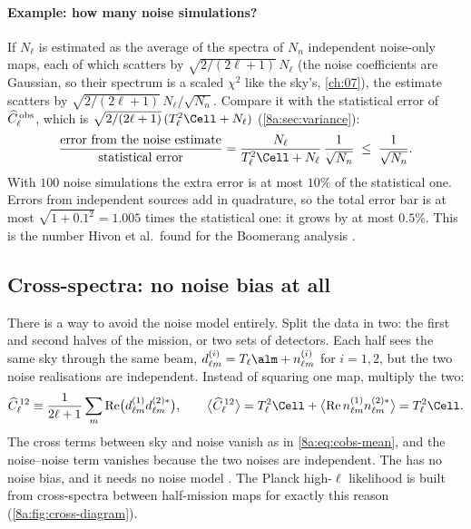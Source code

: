 \paragraph{Example: how many noise simulations?}
If $N_\ell$ is estimated as the average of the spectra of $N_n$ independent noise-only maps,
each of which scatters by $\sqrt{2/(2\ell+1)}\,N_\ell$ (the noise coefficients are Gaussian, so
their spectrum is a scaled $\chi^2$ like the sky's, \cref{ch:07}), the estimate scatters by
$\sqrt{2/(2\ell+1)}\,N_\ell/\sqrt{N_n}$. Compare it with the statistical error of
$\widehat C^{\,\rm obs}_\ell$, which is $\sqrt{2/(2\ell+1)}\,(T_\ell^2\Cell+N_\ell)$
(\cref{8a:sec:variance}):
\begin{equation}
  \frac{\text{error from the noise estimate}}{\text{statistical error}}
  =\frac{N_\ell}{T_\ell^2\Cell+N_\ell}\,\frac{1}{\sqrt{N_n}}\;\le\;\frac{1}{\sqrt{N_n}} .
  \label{8a:eq:nsim-noise}
\end{equation}
With $100$ noise simulations the extra error is at most $10\%$ of the statistical one. Errors
from independent sources add in quadrature, so the total error bar is at most
$\sqrt{1+0.1^2}=1.005$ times the statistical one: it grows by at most $0.5\%$. This is the number
Hivon et al.\ found for the Boomerang analysis .

\subsection{Cross-spectra: no noise bias at all}
\label{8a:sec:cross}

There is a way to avoid the noise model entirely. Split the data in two: the first and second
halves of the mission, or two sets of detectors. Each half sees the same sky through the same
beam, $d^{(i)}_{\ell m}=T_\ell\alm+n^{(i)}_{\ell m}$ for $i=1,2$, but the two noise realisations
are independent. Instead of squaring one map, multiply the two:
\begin{equation}
  \widehat C^{\,12}_\ell\equiv\frac{1}{2\ell+1}\sum_m{\rm Re}\bigl(d^{(1)}_{\ell m}d^{(2)*}_{\ell m}\bigr),
  \qquad
  \bigl\langle\widehat C^{\,12}_\ell\bigr\rangle=T_\ell^2\Cell+\bigl\langle{\rm Re}\,n^{(1)}_{\ell m}n^{(2)*}_{\ell m}\bigr\rangle=T_\ell^2\Cell .
  \label{8a:eq:cross}
\end{equation}
The cross terms between sky and noise vanish as in \eqref{8a:eq:cobs-mean}, and the
noise--noise term vanishes because the two noises are independent. The
 has no noise bias, and it needs no noise model
\cite{HamimecheLewis2008}. The Planck high-$\ell$ likelihood is built from cross-spectra
between half-mission maps for exactly this reason \cite{Planck2018V}
(\cref{8a:fig:cross-diagram}).

